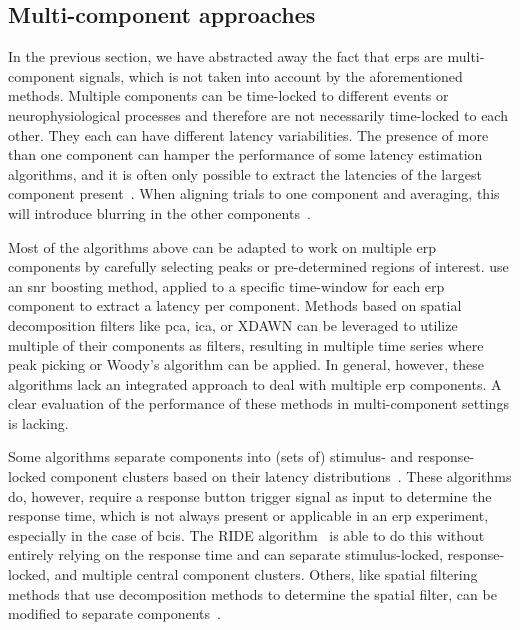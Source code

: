\subsection{Multi-component approaches}
\label{sec:wcble/literature/multi-comp}
In the previous section, we have abstracted away the fact that \acp{erp} are
multi-component signals, which is not taken into account by the aforementioned
methods.
Multiple components can be time-locked to different events or neurophysiological
processes and therefore are not necessarily time-locked to each other. They
each can have different latency variabilities.
The presence of more than one component can hamper the
performance of some latency estimation algorithms, and it is often only possible to extract the latencies of the largest component present~\cite{Ouyang2017}. When aligning trials
to one component and averaging, this will introduce blurring in the other
components~\cite{Ouyang2020}.

Most of the algorithms above can be adapted to work on multiple \ac{erp} components
by carefully selecting peaks or pre-determined regions of interest.
\textcite{Hardiansyah2020} use an \ac{snr} boosting method, applied to a specific
time-window for each \ac{erp} component to extract a latency per component.
Methods based on spatial decomposition filters like \ac{pca}, \ac{ica}, or XDAWN can be leveraged
to utilize multiple of their components as filters, resulting in multiple time
series where peak picking or Woody's algorithm can be applied. In general,
however, these algorithms lack an integrated approach to deal with multiple
\ac{erp} components. A clear evaluation of the performance of these
methods in multi-component settings is lacking.

Some algorithms separate components into (sets of) stimulus- and response-locked component clusters based on their
latency distributions~\cite{Jung2001, Takeda2008, Zhang1998, Yin2009}.
These algorithms do, however, require a response
button trigger signal as input to determine the response time, which is
not always present or applicable in an \ac{erp} experiment, especially in
the case of \acp{bci}.
The RIDE algorithm~\cite{Ouyang2011, Ouyang2015, Wang2015, Ouyang2016, Ouyang2020}
is able to do this without entirely relying on the response time and can
separate stimulus-locked, response-locked, and multiple central component clusters.
Others, like spatial filtering methods that use decomposition methods to
determine the spatial filter, can be modified to separate
components~\cite{Ouyang2017}.

